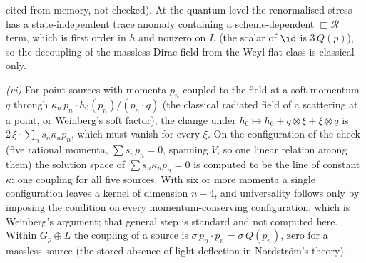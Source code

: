 cited from memory, not checked). At the quantum level the renormalised stress has a state-independent trace anomaly containing a scheme-dependent $\Box\mathcal{R}$ term, which is first order in $h$ and nonzero on $L$ (the scalar of $\id$ is $3\,Q(p)$), so the decoupling of the massless Dirac field from the Weyl-flat class is classical only.

\emph{(vi)} For point sources with momenta $p_{n}$ coupled to the field at a soft momentum $q$ through $\kappa_{n}\,p_{n} \cdot h_{0}(p_{n})/(p_{n} \cdot q)$ (the classical radiated field of a scattering at a point, or Weinberg's soft factor), the change under $h_{0} \mapsto h_{0} + q \otimes \xi + \xi \otimes q$ is $2\,\xi \cdot \sum_{n} s_{n}\kappa_{n}p_{n}$, which must vanish for every $\xi$. On the configuration of the check (five rational momenta, $\sum s_{n}p_{n} = 0$, spanning $V$, so one linear relation among them) the solution space of $\sum s_{n}\kappa_{n}p_{n} = 0$ is computed to be the line of constant $\kappa$: one coupling for all five sources. With six or more momenta a single configuration leaves a kernel of dimension $n - 4$, and universality follows only by imposing the condition on every momentum-conserving configuration, which is Weinberg's argument; that general step is standard and not computed here. Within $G_{p} \oplus L$ the coupling of a source is $\sigma\,p_{n} \cdot p_{n} = \sigma\,Q(p_{n})$, zero for a massless source (the stored absence of light deflection in Nordstr\"om's theory).

